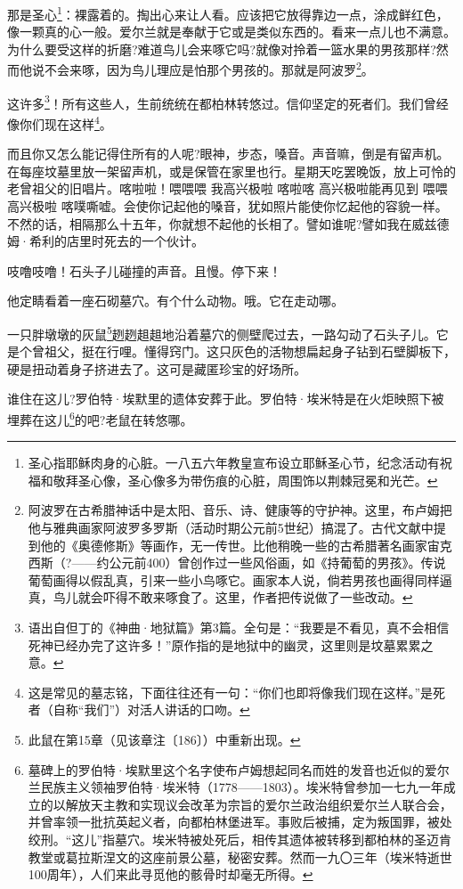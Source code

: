 \par 那是圣心\footnote{圣心指耶稣肉身的心脏。一八五六年教皇宣布设立耶稣圣心节，纪念活动有祝福和敬拜圣心像，圣心像多为带伤痕的心脏，周围饰以荆棘冠冕和光芒。}：裸露着的。掏出心来让人看。应该把它放得靠边一点，涂成鲜红色，像一颗真的心一般。爱尔兰就是奉献于它或是类似东西的。看来一点儿也不满意。为什么要受这样的折磨?难道鸟儿会来啄它吗?就像对拎着一篮水果的男孩那样?然而他说不会来啄，因为鸟儿理应是怕那个男孩的。那就是阿波罗\footnote{阿波罗在古希腊神话中是太阳、音乐、诗、健康等的守护神。这里，布卢姆把他与雅典画家阿波罗多罗斯（活动时期公元前5世纪）搞混了。古代文献中提到他的《奥德修斯》等画作，无一传世。比他稍晚一些的古希腊著名画家宙克西斯（?——约公元前400）曾创作过一些风俗画，如《持葡萄的男孩》。传说葡萄画得以假乱真，引来一些小鸟啄它。画家本人说，倘若男孩也画得同样逼真，鸟儿就会吓得不敢来啄食了。这里，作者把传说做了一些改动。}。
\par 这许多\footnote{语出自但丁的《神曲·地狱篇》第3篇。全句是：“我要是不看见，真不会相信死神已经办完了这许多！”原作指的是地狱中的幽灵，这里则是坟墓累累之意。}！所有这些人，生前统统在都柏林转悠过。信仰坚定的死者们。我们曾经像你们现在这样\footnote{这是常见的墓志铭，下面往往还有一句：“你们也即将像我们现在这样。”是死者（自称“我们”）对活人讲话的口吻。}。
\par 而且你又怎么能记得住所有的人呢?眼神，步态，嗓音。声音嘛，倒是有留声机。在每座坟墓里放一架留声机，或是保管在家里也行。星期天吃罢晚饭，放上可怜的老曾祖父的旧唱片。喀啦啦！喂喂喂 我高兴极啦 喀啦喀 高兴极啦能再见到 喂喂 高兴极啦 喀噗嘶嘘。会使你记起他的嗓音，犹如照片能使你忆起他的容貌一样。不然的话，相隔那么十五年，你就想不起他的长相了。譬如谁呢?譬如我在威兹德姆·希利的店里时死去的一个伙计。
\par 吱噜吱噜！石头子儿碰撞的声音。且慢。停下来！
\par 他定睛看着一座石砌墓穴。有个什么动物。哦。它在走动哪。
\par 一只胖墩墩的灰鼠\footnote{此鼠在第15章（见该章注〔186〕）中重新出现。}趔趔趄趄地沿着墓穴的侧壁爬过去，一路勾动了石头子儿。它是个曾祖父，挺在行哩。懂得窍门。这只灰色的活物想扁起身子钻到石壁脚板下，硬是扭动着身子挤进去了。这可是藏匿珍宝的好场所。
\par 谁住在这儿?罗伯特·埃默里的遗体安葬于此。罗伯特·埃米特是在火炬映照下被埋葬在这儿\footnote{墓碑上的罗伯特·埃默里这个名字使布卢姆想起同名而姓的发音也近似的爱尔兰民族主义领袖罗伯特·埃米特（1778——1803）。埃米特曾参加一七九一年成立的以解放天主教和实现议会改革为宗旨的爱尔兰政治组织爱尔兰人联合会，并曾率领一批抗英起义者，向都柏林堡进军。事败后被捕，定为叛国罪，被处绞刑。“这儿”指墓穴。埃米特被处死后，相传其遗体被转移到都柏林的圣迈肯教堂或葛拉斯涅文的这座前景公墓，秘密安葬。然而一九〇三年（埃米特逝世100周年），人们来此寻觅他的骸骨时却毫无所得。}的吧?老鼠在转悠哪。
